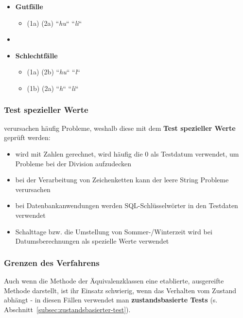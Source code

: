 \begin{itemize}
    \item \textbf{Gutfälle}
    \begin{itemize}
        \item[] (1a) (2a) ``\textit{hu}`` ``\textit{li}``
    \end{itemize}
    \item \item \textbf{Schlechtfälle}
    \begin{itemize}
        \item[] (1a) (2b) ``\textit{hu}`` ``\textit{l}``
        \item[] (1b) (2a) ``\textit{h}`` ``\textit{li}``
    \end{itemize}
\end{itemize}

\subsubsection*{Test spezieller Werte}
 verursachen häufig Probleme, weshalb diese mit dem \textbf{Test spezieller Werte} geprüft werden:

\begin{itemize}
    \item wird mit Zahlen gerechnet, wird häufig die $0$ als Testdatum verwendet, um Probleme bei der Division aufzudecken
    \item bei der Verarbeitung von Zeichenketten kann der leere String  Probleme verursachen
    \item bei Datenbankanwendungen werden SQL-Schlüsselwörter in den Testdaten verwendet
    \item Schalttage bzw. die Umstellung von Sommer-/Winterzeit wird bei Datumsberechnungen als spezielle Werte verwendet
\end{itemize}

\subsubsection*{Grenzen des Verfahrens}
Auch wenn die Methode der Äquivalenzklassen eine etablierte, ausgereifte Methode darstellt, ist ihr Einsatz schwierig, wenn das Verhalten vom Zustand abhängt - in diesen Fällen verwendet man \textbf{zustandsbasierte Tests} (s. Abschnitt~\ref{subsec:zustandsbasierter-test}).


